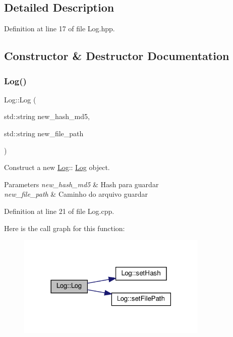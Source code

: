 \subsection{Detailed Description}


Definition at line 17 of file Log.\+hpp.



\subsection{Constructor \& Destructor Documentation}
\mbox{\label{class_log_ae0979fb7a7f032fe453354c0bb204736}} 
\subsubsection{\texorpdfstring{Log()}{Log()}\hspace{0.1cm}{\footnotesize\ttfamily [1/2]}}
{\footnotesize\ttfamily Log\+::\+Log (\begin{DoxyParamCaption}\item[{std\+::string}]{new\+\_\+hash\+\_\+md5,  }\item[{std\+::string}]{new\+\_\+file\+\_\+path }\end{DoxyParamCaption})}



Construct a new \hyperlink{class_log}{Log}\+:\+: \hyperlink{class_log}{Log} object. 


\begin{DoxyParams}{Parameters}
{\em new\+\_\+hash\+\_\+md5} & Hash para guardar \\
\hline
{\em new\+\_\+file\+\_\+path} & Caminho do arquivo guardar \\
\hline
\end{DoxyParams}


Definition at line 21 of file Log.\+cpp.

Here is the call graph for this function\+:
\nopagebreak
\begin{figure}[H]
\begin{center}
\leavevmode
\includegraphics[width=258pt]{d6/d70/class_log_ae0979fb7a7f032fe453354c0bb204736_cgraph}
\end{center}
\end{figure}
\mbox{\label{class_log_a5c787984156efa09d466da5f2c832168}} 
